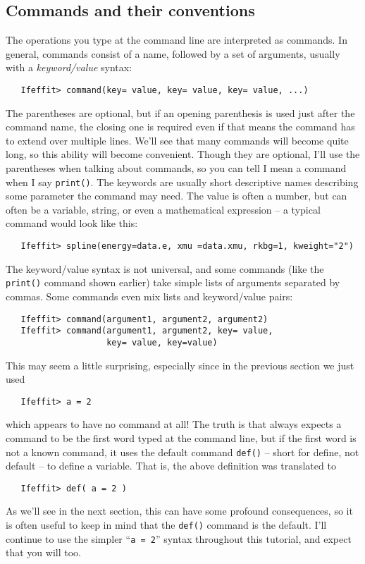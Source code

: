 \documentclass[11pt]{article}
\begin{document}
\subsection{Commands and their conventions}
\label{s:datatypes:commands}

The operations you type at the {\ifeffit} command line are interpreted as
commands. In general, {\ifeffit} commands consist of a name, followed by a
set of arguments, usually with a {\emph{keyword/value}} syntax:
{\small\begin{verbatim}
   Ifeffit> command(key= value, key= value, key= value, ...)
\end{verbatim}}
\noindent

The parentheses are optional, but if an opening parenthesis is used just
after the command name, the closing one is required even if that means the
command has to extend over multiple lines.  We'll see that many commands
will become quite long, so this ability will become convenient.  Though
they are optional, I'll use the parentheses when talking about commands, so
you can tell I mean a command when I say {\tt{print()}}.  The keywords are
usually short descriptive names describing some parameter the command may
need.  The value is often a number, but can often be a variable, string, or
even a mathematical expression -- a typical command would look like this:
{\small\begin{verbatim}
   Ifeffit> spline(energy=data.e, xmu =data.xmu, rkbg=1, kweight="2")
\end{verbatim}}
\noindent
The {{keyword/value}} syntax is not universal, and some commands (like the
{\tt{print()}} command shown earlier) take simple lists of arguments
separated by commas.  Some commands even mix lists and {{keyword/value}}
pairs:
{\small\begin{verbatim}
   Ifeffit> command(argument1, argument2, argument2)
   Ifeffit> command(argument1, argument2, key= value, 
                    key= value, key=value)
\end{verbatim}}
\noindent
This may seem a little surprising, especially since in the previous section
we just used  
{\small\begin{verbatim}
   Ifeffit> a = 2
\end{verbatim}}
\noindent
which appears to have no command at all!  The truth is that {\ifeffit} 
always expects a command to be the first word typed at the command line, 
but if the first word is not a known command, it uses the default command
{\tt{def()}} -- short for define, not default -- to  define a variable. 
That is, the above definition was translated to 
{\small\begin{verbatim}
   Ifeffit> def( a = 2 )
\end{verbatim}}
\noindent
As we'll see in the next section, this can have some profound consequences,
so it is often useful to keep in mind that the {\tt{def()}} command is the
default.  I'll continue to use the simpler ``{\tt a = 2}'' syntax
throughout this tutorial, and expect that you will too.
\end{document}
